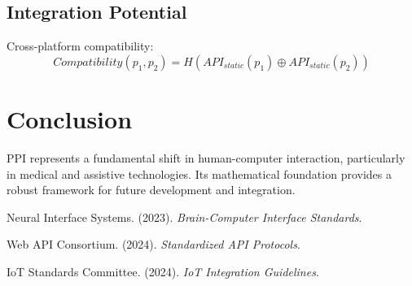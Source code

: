 \documentclass[12pt]{article}
\begin{document}
\subsection{Integration Potential}
Cross-platform compatibility:
\[Compatibility(p_1, p_2) = H(API_{static}(p_1) \oplus API_{static}(p_2))\]

\section{Conclusion}
PPI represents a fundamental shift in human-computer interaction, particularly in medical and assistive technologies. Its mathematical foundation provides a robust framework for future development and integration.

\begin{thebibliography}{9}
Neural Interface Systems. (2023).
\textit{Brain-Computer Interface Standards}.

Web API Consortium. (2024).
\textit{Standardized API Protocols}.

IoT Standards Committee. (2024).
\textit{IoT Integration Guidelines}.
\end{thebibliography}
\end{document}
